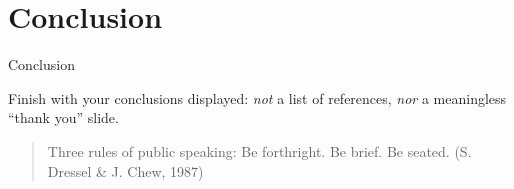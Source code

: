 \documentclass[ignorenonframetext,12pt]{beamer}
\begin{document}
\section{Conclusion}
\begin{frame}{Conclusion}

				Finish with your conclusions displayed: \emph{not} a list of references, \emph{nor} a meaningless ``thank you'' slide.

				\vfill
				\begin{quote}
								Three rules of public speaking: Be forthright.  Be brief.  Be
								seated. \hfill(S. Dressel \& J. Chew, 1987)
				\end{quote}
\end{frame}
\end{document}
